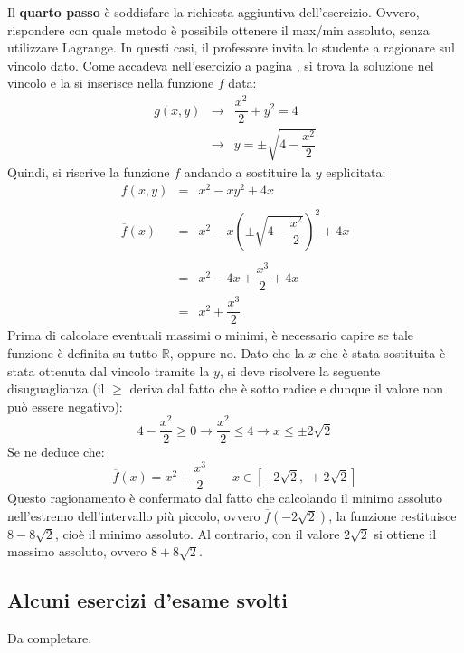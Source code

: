 \documentclass[a4paper]{article}
\begin{document}
	\noindent
	Il \textbf{quarto passo} è soddisfare la richiesta aggiuntiva dell'esercizio. Ovvero, rispondere con quale metodo è possibile ottenere il max/min assoluto, senza utilizzare Lagrange. In questi casi, il professore invita lo studente a ragionare sul vincolo dato.
	Come accadeva nell'esercizio a pagina \pageref{par: trovare il massimo/minimo assoluto della funzione nel caso sia soggetta ad un vincolo}, si trova la soluzione nel vincolo e la si inserisce nella funzione $f$ data:
	\begin{equation*}
		\begin{array}{rcl}
			g\left(x,y\right) &\longrightarrow& \dfrac{x^{2}}{2} + y^{2} = 4 \\
			&\longrightarrow& y = \pm \sqrt{4 - \dfrac{x^{2}}{2}}
		\end{array}
	\end{equation*}
	Quindi, si riscrive la funzione $f$ andando a sostituire la $y$ esplicitata:
	\begin{equation*}
		\begin{array}{rcl}
			f\left(x,y\right) &=& x^{2}-xy^{2}+4x \\
			\\
			\overline{f}\left(x\right) &=& x^{2} - x\left(\pm \sqrt{4 - \dfrac{x^{2}}{2}}\right)^{2} + 4x \\
			\\
			&=& x^{2} - 4x + \dfrac{x^{3}}{2} + 4x \\
			&=& x^{2} + \dfrac{x^{3}}{2}
		\end{array}
	\end{equation*}
	Prima di calcolare eventuali massimi o minimi, è necessario capire se tale funzione è definita su tutto $\mathbb{R}$, oppure no. Dato che la $x$ che è stata sostituita è stata ottenuta dal vincolo tramite la $y$, si deve risolvere la seguente disuguaglianza (il $\ge$ deriva dal fatto che è sotto radice e dunque il valore non può essere negativo):
	\begin{equation*}
		4 - \dfrac{x^{2}}{2} \ge 0 \longrightarrow \dfrac{x^{2}}{2} \le 4 \longrightarrow x \le \pm 2\sqrt{2}
	\end{equation*}
	Se ne deduce che:
	\begin{equation*}
		\overline{f}\left(x\right) = x^{2} + \dfrac{x^{3}}{2} \hspace{2em} x \in \left[-2\sqrt{2},\: +2\sqrt{2}\right]
	\end{equation*}
	Questo ragionamento è confermato dal fatto che calcolando il minimo assoluto nell'estremo dell'intervallo più piccolo, ovvero $\overline{f}\left(-2\sqrt{2}\right)$, la funzione restituisce $8-8\sqrt{2}$, cioè il minimo assoluto. Al contrario, con il valore $2\sqrt{2}$ si ottiene il massimo assoluto, ovvero $8+8\sqrt{2}$.\newpage

	\subsection{Alcuni esercizi d'esame svolti}
	Da completare.
\end{document}
